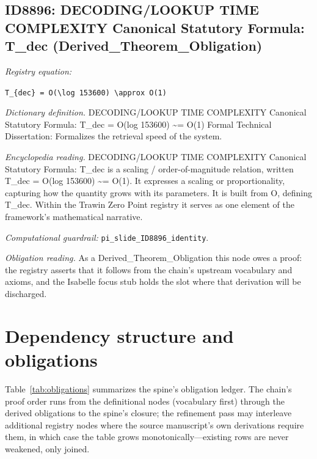\documentclass[11pt]{article}
\theoremstyle{remark}
\begin{document}
\subsection{ID8896: DECODING/LOOKUP TIME COMPLEXITY Canonical Statutory Formula: T\_dec (Derived\_Theorem\_Obligation)}

\noindent\textit{Registry equation:}\par
{\small\texttt{T\_\{dec\} = O(\textbackslash{}log 153600) \textbackslash{}approx O(1)}}\par\medskip
\noindent\textit{Dictionary definition.} DECODING/LOOKUP TIME COMPLEXITY Canonical Statutory Formula: T\_dec = O(log 153600) \textasciitilde{}= O(1) Formal Technical Dissertation: Formalizes the retrieval speed of the system.\par\medskip
\noindent\textit{Encyclopedia reading.} DECODING/LOOKUP TIME COMPLEXITY Canonical Statutory Formula: T\_dec is a scaling / order-of-magnitude relation, written T\_dec = O(log 153600) \textasciitilde{}= O(1). It expresses a scaling or proportionality, capturing how the quantity grows with its parameters. It is built from O, defining T\_dec. Within the Trawin Zero Point registry it serves as one element of the framework's mathematical narrative.
\par\medskip\noindent\textit{Computational guardrail:} \texttt{pi\_slide\_ID8896\_identity}.
\par\medskip\noindent\textit{Obligation reading.} As a Derived\_Theorem\_Obligation this node owes a proof: the registry asserts that it follows from the chain's upstream vocabulary and axioms, and the Isabelle focus stub holds the slot where that derivation will be discharged.

\section{Dependency structure and obligations}
\label{sec:dep}

Table~\ref{tab:obligations} summarizes the spine's obligation ledger. The chain's proof order runs from the definitional nodes (vocabulary first) through the derived obligations to the spine's closure; the refinement pass may interleave additional registry nodes where the source manuscript's own derivations require them, in which case the table grows monotonically---existing rows are never weakened, only joined.
\end{document}
